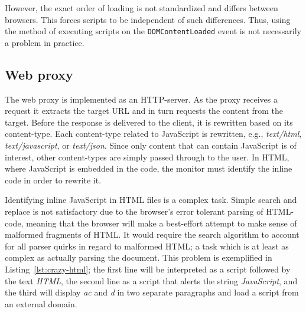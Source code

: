 \documentclass{llncs}
\begin{document}
However, the exact order of loading is not standardized and differs between
browsers. This forces scripts to be independent of such differences. Thus,
using the method of executing scripts on the \lstinline{DOMContentLoaded} event is not
necessarily a problem in practice. 


\subsection{Web proxy}


The web proxy is implemented as an HTTP-server. As the 
proxy receives a request it extracts the target URL and in turn requests the 
content from the target. Before the response is delivered to the client, it is 
rewritten based on its content-type. Each content-type related to JavaScript is 
rewritten, e.g., \emph{text/html}, \emph{text/javascript}, or \emph{text/json}. 
Since only content that can contain JavaScript is of interest, other 
content-types are simply passed through to the user. In HTML, where 
JavaScript is embedded in the code, the monitor must identify 
the inline code in order to rewrite it.

Identifying inline JavaScript in HTML files is a complex task. 
Simple search and replace is not satisfactory due to the browser's error tolerant parsing of HTML-code, meaning that the 
browser will make a best-effort attempt to make sense of malformed fragments of 
HTML. It would require the search 
algorithm to account for all parser quirks in regard to malformed HTML;
a task which is at least as complex as actually parsing the document.
This problem is exemplified in Listing~\ref{lst:crazy-html}; the first line
will be interpreted as a script followed by the text \emph{HTML}, the second
line as a script that alerts the string \emph{JavaScript}, and the third will 
display \emph{ac} and \emph{d} in two separate paragraphs and load a script
from an external domain.
\end{document}
